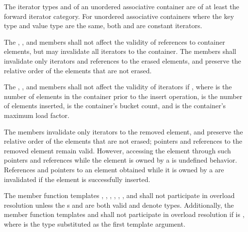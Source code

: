 \pnum
{}%
The iterator types  and  of
an unordered associative container are of at least the forward iterator
category.  For unordered associative containers where the key type and
value type are the same, both  and
 are constant iterators.

\pnum
{}%
The , , and  members
shall not affect the validity of references to
container elements, but may invalidate all iterators to the
container.  The  members shall invalidate only iterators and
references to the erased elements, and preserve the relative order of the
elements that are not erased.

\pnum
{}%
%
The , , and  members
shall not affect the validity of iterators if
, where  is the number of elements in
the container prior to the insert operation,  is the
number of elements inserted,  is the container's bucket count, and
 is the container's maximum load factor.

\pnum
The  members invalidate only iterators to the removed element,
and preserve the relative order of the elements that are not erased; pointers
and references to the removed element remain valid. However, accessing the
element through such pointers and references while the element is owned by a
 is undefined behavior. References and pointers to an element
obtained while it is owned by a  are invalidated if the
element is successfully inserted.

\pnum
The member function templates
, , , ,
, , and 
shall not participate in overload resolution unless
the s
 and
are both valid and denote types.
Additionally, the member function templates  and 
shall not participate in overload resolution if
is ,
where  is the type substituted as the first template argument.

